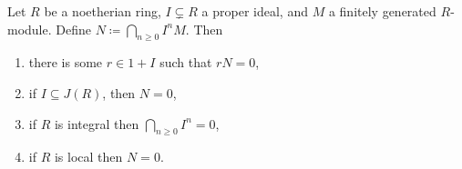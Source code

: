 Let $R$ be a noetherian ring, $I \subsetneq R$ a proper ideal, and $M$ a finitely generated
$R$-module. Define $N\coloneqq \bigcap_{n\geq 0} I^nM$. Then
\begin{enumerate}[label=(\roman*)]
	\item there is some $r \in 1+I$ such that $rN = 0$,
	\item if $I \subseteq J(R)$, then $N = 0$,
	\item if $R$ is integral then $\bigcap_{n\geq 0}I^n = 0$,
	\item if $R$ is local then $N = 0$.
\end{enumerate}
